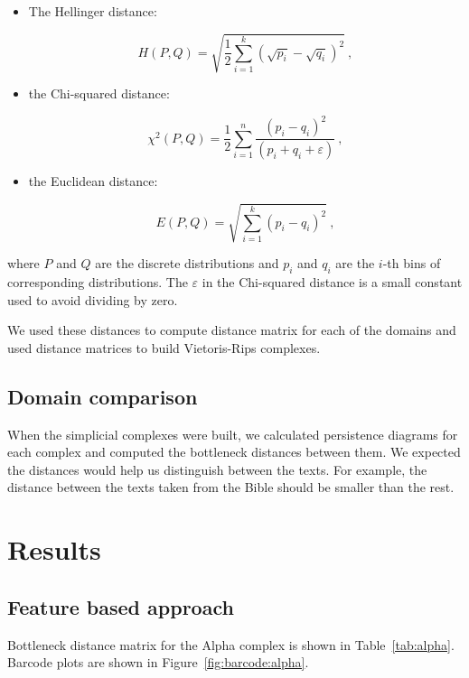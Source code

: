 \documentclass[12pt,a4paper]{amsart}
\begin{document}
\begin{itemize}
\item The Hellinger distance:

\begin{equation*}
  H(P,Q) = \sqrt{\frac{1}{2} \sum_{i=1}^k\left(\sqrt{p_i} -
    \sqrt{q_i}\right)^2}\ ,
\end{equation*}

\item the Chi-squared distance:

\begin{equation*}
  \chi^2(P,Q) = \frac{1}{2}\sum _{i=1}^n\frac{(p_i - q_i)^2}{(p_i + q_i + \varepsilon)}\ ,
\end{equation*}

\item the Euclidean distance:

\begin{equation*}
  E(P,Q) = \sqrt{\sum_{i=1}^k\left(p_i - q_i\right)^2}\ ,
\end{equation*}
\end{itemize}

\noindent
where $P$ and $Q$ are the discrete distributions and $p_i$ and $q_i$ are the
$i$-th bins of corresponding distributions. The $\varepsilon$ in the Chi-squared
distance is a small constant used to avoid dividing by zero.

We used these distances to compute distance matrix for each of the
domains and used distance matrices to build Vietoris-Rips complexes.

\subsection{Domain comparison}

When the simplicial complexes were built, we calculated persistence diagrams for
each complex and computed the bottleneck distances between them. We expected the
distances would help us distinguish between the texts. For example, the distance
between the texts taken from the Bible should be smaller than the rest.

\section{Results}

\subsection{Feature based approach} Bottleneck
distance matrix for the Alpha complex is shown in Table~\ref{tab:alpha}.
Barcode plots are shown in Figure~\ref{fig:barcode:alpha}.
\end{document}
